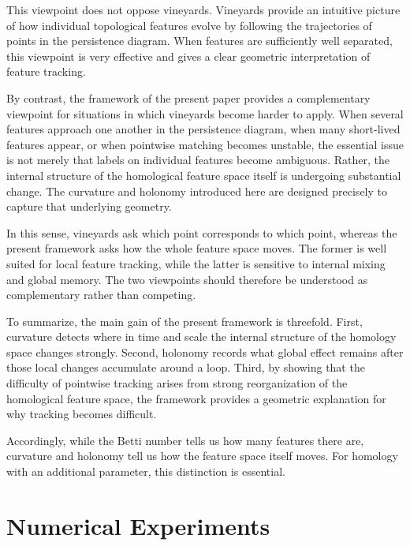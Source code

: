 \documentclass[pdflatex,sn-mathphys-num]{sn-jnl}%
\theoremstyle{thmstyleone}%
\theoremstyle{thmstyletwo}%
\theoremstyle{thmstylethree}%
\begin{document}
This viewpoint does not oppose vineyards. Vineyards provide an intuitive picture of how individual topological features evolve by following the trajectories of points in the persistence diagram. When features are sufficiently well separated, this viewpoint is very effective and gives a clear geometric interpretation of feature tracking.

By contrast, the framework of the present paper provides a complementary viewpoint for situations in which vineyards become harder to apply. When several features approach one another in the persistence diagram, when many short-lived features appear, or when pointwise matching becomes unstable, the essential issue is not merely that labels on individual features become ambiguous. Rather, the internal structure of the homological feature space itself is undergoing substantial change. The curvature and holonomy introduced here are designed precisely to capture that underlying geometry.

In this sense, vineyards ask which point corresponds to which point, whereas the present framework asks how the whole feature space moves. The former is well suited for local feature tracking, while the latter is sensitive to internal mixing and global memory. The two viewpoints should therefore be understood as complementary rather than competing.

To summarize, the main gain of the present framework is threefold. First, curvature detects where in time and scale the internal structure of the homology space changes strongly. Second, holonomy records what global effect remains after those local changes accumulate around a loop. Third, by showing that the difficulty of pointwise tracking arises from strong reorganization of the homological feature space, the framework provides a geometric explanation for why tracking becomes difficult.

Accordingly, while the Betti number tells us how many features there are, curvature and holonomy tell us how the feature space itself moves. For homology with an additional parameter, this distinction is essential.



\section{Numerical Experiments}
\end{document}
